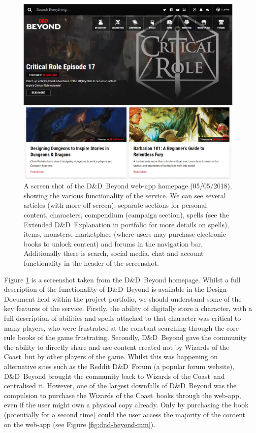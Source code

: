 \documentclass[final]{cmpreport}
\newcommand{\WotC}{Wizards of the Coast}
\newcommand{\dnd}{D\&D}
\begin{document}
			\begin{figure}[H]
				\centering
				\includegraphics[width=\linewidth]{dnd-beyond.png}
				\caption[\dnd \ Beyond hompage screenshot]{A screen shot of the \dnd \ Beyond web-app homepage (05/05/2018), showing the various functionality of the service. We can see several articles (with more off-screen); separate sections for personal content, characters, compendium (campaign section), spells (see the Extended \dnd \ Explanation in portfolio for more details on spells), items, monsters, marketplace (where users may purchase electronic books to unlock content) and forums in the navigation bar. Additionally there is search, social media, chat and account functionality in the header of the screenshot.} \label{fig:dnd-beyond}
			\end{figure}
		
			Figure \ref{fig:dnd-beyond} is a screenshot taken from the \dnd \ Beyond homepage. Whilst a full description of the functionality of \dnd \ Beyond is available in the Design Document held within the project portfolio, we should understand some of the key features of the service. Firstly, the ability of digitally store a character, with a full description of abilities and spells attached to that character was critical to many players, who were frustrated at the constant searching through the core rule books of the game frustrating. Secondly, \dnd \ Beyond gave the community the ability to directly share and use content created not by \WotC \ but by other players of the game. Whilst this was happening on alternative sites such as the Reddit \dnd \ Forum \citep{reddit-dnd} (a popular forum website), \dnd \ Beyond brought the community back to \WotC \ and centralised it. However, one of the largest downfalls of \dnd \ Beyond was the compulsion to purchase the \WotC \ books through the web-app, even if the user might own a physical copy already. Only by purchasing the book (potentially for a second time) could the user access the majority of the content on the web-app (see Figure \ref{fig:dnd-beyond-mm}).
			
\end{document}
